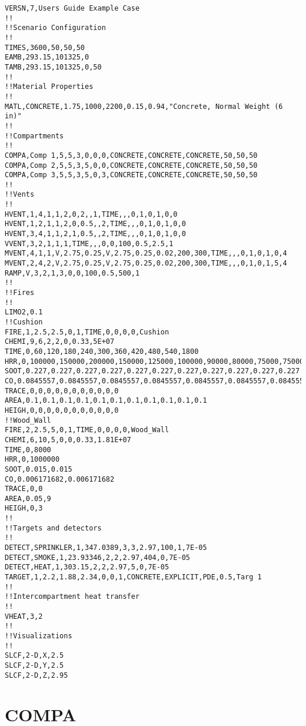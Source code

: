 \begin{lstlisting}
VERSN,7,Users Guide Example Case
!!
!!Scenario Configuration
!!
TIMES,3600,50,50,50
EAMB,293.15,101325,0
TAMB,293.15,101325,0,50
!!
!!Material Properties
!!
MATL,CONCRETE,1.75,1000,2200,0.15,0.94,"Concrete, Normal Weight (6 in)"
!!
!!Compartments
!!
COMPA,Comp 1,5,5,3,0,0,0,CONCRETE,CONCRETE,CONCRETE,50,50,50
COMPA,Comp 2,5,5,3,5,0,0,CONCRETE,CONCRETE,CONCRETE,50,50,50
COMPA,Comp 3,5,5,3,5,0,3,CONCRETE,CONCRETE,CONCRETE,50,50,50
!!
!!Vents
!!
HVENT,1,4,1,1,2,0,2,,1,TIME,,,0,1,0,1,0,0
HVENT,1,2,1,1,2,0,0.5,,2,TIME,,,0,1,0,1,0,0
HVENT,3,4,1,1,2,1,0.5,,2,TIME,,,0,1,0,1,0,0
VVENT,3,2,1,1,1,TIME,,,0,0,100,0.5,2.5,1
MVENT,4,1,1,V,2.75,0.25,V,2.75,0.25,0.02,200,300,TIME,,,0,1,0,1,0,4
MVENT,2,4,2,V,2.75,0.25,V,2.75,0.25,0.02,200,300,TIME,,,0,1,0,1,5,4
RAMP,V,3,2,1,3,0,0,100,0.5,500,1
!!
!!Fires
!!
LIMO2,0.1
!!Cushion
FIRE,1,2.5,2.5,0,1,TIME,0,0,0,0,Cushion
CHEMI,9,6,2,2,0,0.33,5E+07
TIME,0,60,120,180,240,300,360,420,480,540,1800
HRR,0,100000,150000,200000,150000,125000,100000,90000,80000,75000,75000
SOOT,0.227,0.227,0.227,0.227,0.227,0.227,0.227,0.227,0.227,0.227,0.227
CO,0.0845557,0.0845557,0.0845557,0.0845557,0.0845557,0.0845557,0.0845557,0.0845557,0.0845557,0.0845557,0.0845557
TRACE,0,0,0,0,0,0,0,0,0,0,0
AREA,0.1,0.1,0.1,0.1,0.1,0.1,0.1,0.1,0.1,0.1,0.1
HEIGH,0,0,0,0,0,0,0,0,0,0,0
!!Wood_Wall
FIRE,2,2.5,5,0,1,TIME,0,0,0,0,Wood_Wall
CHEMI,6,10,5,0,0,0.33,1.81E+07
TIME,0,8000
HRR,0,1000000
SOOT,0.015,0.015
CO,0.006171682,0.006171682
TRACE,0,0
AREA,0.05,9
HEIGH,0,3
!!
!!Targets and detectors
!!
DETECT,SPRINKLER,1,347.0389,3,3,2.97,100,1,7E-05
DETECT,SMOKE,1,23.93346,2,2,2.97,404,0,7E-05
DETECT,HEAT,1,303.15,2,2,2.97,5,0,7E-05
TARGET,1,2.2,1.88,2.34,0,0,1,CONCRETE,EXPLICIT,PDE,0.5,Targ 1
!!
!!Intercompartment heat transfer
!!
VHEAT,3,2
!!
!!Visualizations
!!
SLCF,2-D,X,2.5
SLCF,2-D,Y,2.5
SLCF,2-D,Z,2.95

\end{lstlisting}


\section{COMPA}

